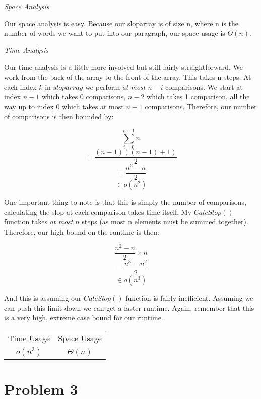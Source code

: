 \documentclass[11pt, letterpaper]{article}
\begin{document}
\begin{center}
\textit{Space Analysis}
\end{center}

\quad Our space analysis is easy. Because our sloparray is of size n, where n is the number of words we want to put into our paragraph, our space usage is $\Theta(n)$. 

\begin{center}
\textit{Time Analysis}
\end{center}

\quad Our time analysis is a little more involved but still fairly straightforward. We work from the back of the array to the front of the array. This takes n steps. At each index $k$ in $sloparray$ we perform \textit{at most} $n - i$ comparisons. We start at index $n - 1$ which takes 0 comparisons, $n -2$ which takes 1 comparison, all the way up to index 0 which takes at most $n - 1$ comparisons. Therefore, our number of comparisons is then bounded by:

$$ \sum_{i = 0}^{n - 1} n $$
$$ = \frac{(n - 1) ((n - 1)+1)}{2} $$
$$= \frac{n^2 - n}{2}  $$
$$ \in o(n^2) $$

\quad One important thing to note is that this is simply the number of comparisons, calculating the slop at each comparison takes time itself. My $CalcSlop()$ function takes \textit{at most} $n$ steps (as most n elements must be summed together). Therefore, our high bound on the runtime is then:

$$ \frac{n^2 - n}{2} \times n $$
$$ = \frac{n^3 - n^2}{2} $$
$$ \in o(n^3) $$

\quad And this is assuming our $CalcSlop()$ function is fairly inefficient. Assuming we can push this limit down we can get a faster runtime. Again, remember that this is a very high, extreme case bound for our runtime. 

\begin{center}
\begin{tabular}{c c}
Time Usage & Space Usage \\
$o(n^3)$ & $\Theta(n)$ \\
\end{tabular}
\end{center}

\pagebreak

\section*{Problem 3}
\end{document}
